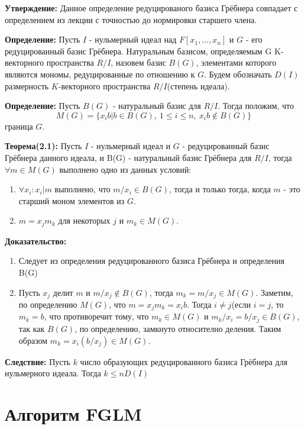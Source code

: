 \documentclass{article}
\begin{document}
    \textbf{Утверждение:} Данное определение редуцированого базиса Грёбнера совпадает с 
    определением из лекции с точностью до нормировки старшего члена.  
     
    \textbf{Определение:} Пусть $I$ - нульмерный идеал над $F[x_1,\ldots,x_n]$ и $G$ - его редуцированный базис Грёбнера.
    Натуральным базисом, определяемым G K-векторного пространства $R/I$, назовем базис $B(G)$, элементами которого являются мономы, редуцированные
    по отношению к $G$. Будем обозначать $D(I)$ размерность $K$-векторного пространства $R/I$(степень идеала).

    \textbf{Определение:} Пусть $B(G)$ - натуральный базис для $R/I$. Тогда положим, что
    $$M(G) = \{x_ib | b \in B(G),\: 1\leq i \leq n,\: x_ib \notin B(G)\}$$ граница $G$.

    \textbf{Теорема(2.1):} Пусть $I$ - нульмерный идеал и $G$ - редуцированный базис Грёбнера данного идеала, и
    B(G) - натуральный базис Грёбнера для $R/I$, тогда $\forall m \in M(G)$ выполнено одно из данных условий:

    \begin{enumerate}
        \item $\forall x_i : x_i | m$ выполнено, что $m/x_i \in B(G)$, тогда и только тогда, когда $m$ - это старший моном элементов из $G$.
        \item $m = x_jm_k$ для некоторых $j$ и $m_k \in M(G)$.
    \end{enumerate}

    \textbf{Доказательство:}
    \begin{enumerate}
        \item Следует из определения редуцированного базиса Грёбнера и определения B(G)
        \item Пусть $x_j$ делит $m$ и $m/x_j \notin B(G)$, тогда $m_k = m/x_j \in M(G)$. Заметим, по определению $M(G)$, что
        $m=x_jm_k=x_ib$. Тогда $i \not= j$(если $i=j$, то $m_k=b$, что противоречит тому, что $m_k \in M(G)$ и $m_k/x_i=b/x_j\in B(G)$, так как $B(G)$, по определению, замкнуто относително деления.
        Таким образом $m_k=x_i(b/x_j)\in M(G)$.
    \end{enumerate}

    \textbf{Следствие:} Пусть $k$ число образующих редуцированного базиса Грёбнера для нульмерного идеала.
        Тогда $k \leq nD(I)$
    
    \newpage    

\section{Алгоритм FGLM}
\end{document}
